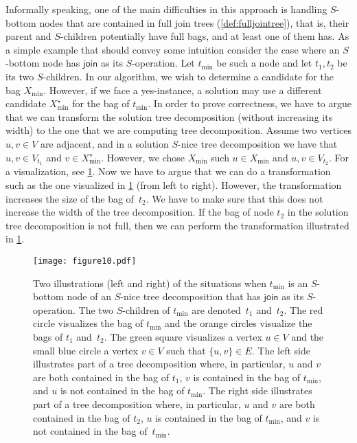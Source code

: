 \documentclass[a4paper,UKenglish,cleveref, autoref, thm-restate, numberwithinsect]{lipics-v2021}
\newcounter{algorithm}
\newcommand{\join}{\mathsf{join}}
\begin{document}
Informally speaking, one of the main difficulties in this approach is handling $S$-bottom nodes that are contained in full join trees (\cref{def:fulljointree}), that is, their parent and $S$-children potentially have full bags, and at least one of them has. 
As a simple example that should convey some intuition consider the case where an $S$-bottom node has $\join$ as its $S$-operation. Let $t_{\min}$ be such a node and let $t_1,t_2$ be its two $S$-children.  
In our algorithm, we wish to determine a candidate for the bag $X_{\min}$. However, if we face a yes-instance, a solution may use a different candidate $X^\star_{\min}$ for the bag of $t_{\min}$. In order to prove correctness, we have to argue that we can transform the solution tree decomposition (without increasing its width) to the one that we are computing tree decomposition. 
 Assume two vertices $u,v\in V$ are adjacent, and in a solution $S$-nice tree decomposition we have that $u,v\in V_{t_1}$ and $v\in X^\star_{\min}$. However, we chose $X_{\min}$ such $u\in X_{\min}$ and $u,v\in V_{t_2}$. For a visualization, see \cref{fig:join1}. Now we have to argue that we can do a transformation such as the one visualized in \cref{fig:join1} (from left to right). However, the transformation increases the size of the bag of~$t_2$. We have to make sure that this does not increase the width of the tree decomposition.
If the bag of node $t_2$ in the solution tree decomposition is not full, then we can perform the transformation illustrated in \cref{fig:join1}. 

\begin{figure}[t]
\centering
\texttt{[image: figure10.pdf]}
    \caption{Two illustrations (left and right) of the situations when $t_{\min}$ is an $S$-bottom node of an $S$-nice tree decomposition that has $\join$ as its $S$-operation. The two $S$-children of $t_{\min}$ are denoted~$t_1$ and~$t_2$. The red circle visualizes the bag of $t_{\min}$ and the orange circles visualize the bags of $t_1$ and~$t_2$. The green square visualizes a vertex $u\in V$ and the small blue circle a vertex $v\in V$ such that $\{u,v\}\in E$. The left side illustrates part of a tree decomposition where, in particular, $u$ and $v$ are both contained in the bag of $t_1$, $v$ is contained in the bag of $t_{\min}$, and $u$ is not contained in the bag of $t_{\min}$. The right side illustrates part of a tree decomposition where, in particular, $u$ and $v$ are both contained in the bag of $t_2$, $u$ is contained in the bag of $t_{\min}$, and $v$ is not contained in the bag of~$t_{\min}$.}\label{fig:join1}
\end{figure}
\end{document}
